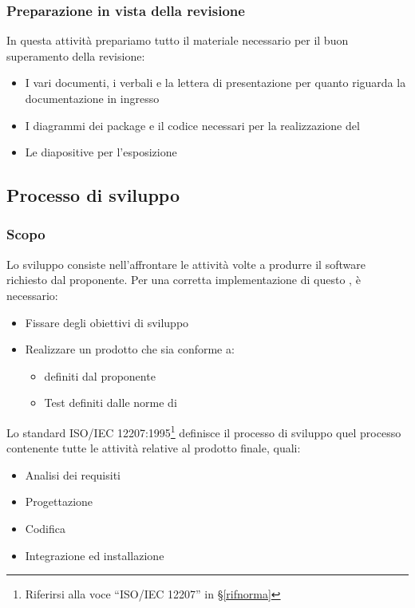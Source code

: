         \subsubsection{Preparazione in vista della revisione}
		In questa attività prepariamo tutto il materiale necessario per il buon superamento della revisione: 
		\begin{itemize}
			\item I vari documenti, i verbali e la lettera di presentazione per quanto riguarda la documentazione in ingresso
			\item I diagrammi dei package e il codice necessari per la realizzazione del 
			\item Le diapositive per l'esposizione
		\end{itemize}

    \subsection{Processo di sviluppo}\label{PP:Sviluppo}

		\subsubsection{Scopo}\label{PP:Sviluppo:Scopo}
		Lo sviluppo consiste nell'affrontare le attività volte a produrre il software richiesto dal proponente.
		Per una corretta implementazione di questo , è necessario:
		\begin{itemize}
			\item Fissare degli obiettivi di sviluppo
			\item Realizzare un prodotto che sia conforme a:
			\begin{itemize}
				\item {} definiti dal proponente
				\item Test definiti dalle norme di 
			\end{itemize}
		\end{itemize}
		Lo standard ISO/IEC 12207:1995\footnote{Riferirsi alla voce ``ISO/IEC 12207'' in \S\ref{rifnorma}} definisce il processo di
		sviluppo quel processo contenente tutte le attività relative al prodotto finale, quali:
		\begin{itemize} %
			\item Analisi dei requisiti
			\item Progettazione
			\item Codifica
			\item Integrazione ed installazione
		\end{itemize}


